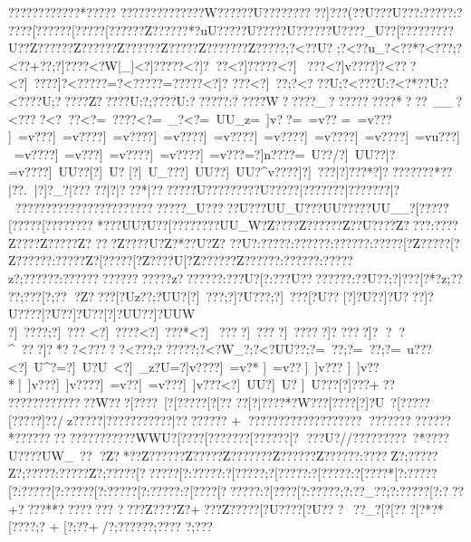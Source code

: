 {{{{{{{{{{{{{{{{{{{{{{{{{{{{{{{{{{{{{{{{{{{{{{{{{{{{{{{{{{{{{{{{{{{{{{{{{{{{{{{{{{{{{{{{{{{{{{{{{{{{{{{{{{{{{{{{{{{{{{{{{{{{{{{{{{{{{{{{{{{{{{{{{{{{{{{{{{{{{{{{{{{{{{{{{{{{{{{{{{{{{{{{{{{{{{{{{{{{{{{{{{{{{{{{{{{{{{{{{{{{{{{{{{{{{{{{{{{{{{{{{{{{{{{{{{{{{{{{{{{{{{{{{{{{{{{{{{{{{{{{{{{{{{{{{{{{{{{{{{{{{{{{{{{{{{{{{{{{{{{{{{{{{{{{{{{{{{{{{{{{{{{{{{{{{{{{{{{{{{{{{{{{{{{{{{{{{{{{{{{{{{{{{{{{{{{{{{{{{{{{{{{{{{{{{{{{{?????{? ?????{? *????{? 
????{? ?????{????W??{????U??{?  ????{???]??{?(??U{???U?  ??:?  ????:? 
????[? ?????[?  ????[? ?????Z?  ????{?*?uU??{? ??U??{? ??U??{????U??{? ?_U??[? ?????{? ??U??Z? ?????Z? ?????Z?????{?Z?  ????Z???????Z?????;?<??U?
;?<??u_?<?\??*? <?\??  ?;?<??+??;?]?? ??<?\?W|_]<?]?????<?]???<?]?????<?]~
???<?]v????]?<???<?]~????]?<?????=?<?????\?=?????<?]?
???<?]~  ??;?<?
??U;?<? ??U:?<?*??U:?<????U;?? ???Z?????U:?;????U:??????:?????W?????_?????????  ?*???~__?<????<???<?=~????<?=~_?<?=~UU_z=~]v? ?=~=v?? 
=~=v??? ]~=v???]~=v????]~=v????]~=v????]~=v????]~=v????]~=v????]~=v????]~=vu???]~=v????]~=v???]~=v????]~=v????]~=v???=?]n????\?=~U??/{?]~UU??|?=v??? {?]~UU??[?]~U?
 [?]~U_??{?]~UU??\?]~UU? \?^v????]?]~??? |?]???*?\?]?  ?\?}?????\?}? *??|?\??.|?]?_?  |?}??
??|?|???*|?}??? ??}?U?? ??}??  ??}?U?????|???????|???????|?????????????{???????{??????{???_U??{???U??{?UU_U??{?UU????{?UU__{?[? ???{?[? ???{?[? ???{?{???
*??{?UU?U??[???????{?UU_W{?Z? ???Z?{?????Z?{?U???{?Z? ??{?:?  ??{?Z?  ??{?Z? ???{?Z? ??{?Z????U{?Z?*??U{?Z? ??U{?:? ???{?:?????{?:?????{?:?????[?Z?????[?Z?????{?:?????Z?[?????[?Z????U[?Z?????{?Z?????{?:?????{?:?????z?;?????{?:?????{??????{??????z??????{?:???U?[?:???U?{??????{?:??U??;?|? ??[?\? *?z;?\?? ??;?\??  ?[?;??
?Z?\????[?\?Uz??;?\?UU? [?]~??? ;?]?U???;?]~??? [?\?U??
[?]?U?  {?]?U? ??]?U???{?]?U?  {?]?U?? [?]?UU??\?]?UUW\\?]~????;?]~???
<?]~????<?]~???*<?]~
????]~ ????]~?????]?
????]?
??^~  ???]? *??<?????<???;??????;?<?W_? ;?<?UU??;?=~??  ;?=~??  ;?=~u???<?]~U^?=?]~U?U~<?]~_z?U=?]v????]~=v?*
 ]~=v?? ]~]v???
]~]v??*]~]v?? ?]~]v????]~=v??  ]~=v??? ]~]v??? <?]~UU?\?]~U?
 \?]~U???[?]???+{?\??

??{??????{????{?{?W??{?[????~[?[?????[?[??
??[?|????*{?\?W???[?}???  [?]?U~? [?}???? [?}?}??{?]??/ z?}???{?|?????{?}?????|?}??????}?
+??????????????????{????????
??????*?????{?????{???????{??WWU{?[? ???[?{?????{?[?????{?[?
  ??{?U?//??{???? ??{?~?*???{?U???{?UW_~{?{?   {?Z? *?{?Z?????{?Z?????Z?{?????{?Z?????{?Z?????{?:????Z?;?????Z?;?????:?{???? Z?;?????[??????[?:?????:?[?????;?[?????:?[?????:?[????*[?:?????[?:?????[?:?????[?:?????[?:?????:?[???? [??????:?[???? [?:?????;?:??_??;?:?????[?:???+{????**{????  {????
 {???   {?Z???{?Z?+??{?Z?? ??{?[?U???{?[?U??
{?~?   {?\?_?[?[???[?\?*?* [?\? ???;?\? 
+
[?;??+/{?;?????{?;????
{?;???
}}}}}}}}}}}}}}}}}}}}}}}}}}}}}}}}}}}}}}}}}}}}}}}}}}}}}}}}}}}}}}}}}}}}}}}}}}}}}}}}}}}}}}}}}}}}}}}}}}}}}}}}}}}}}}}}}}}}}}}}}}}}}}}}}}}}}}}}}}}}}}}}}}}}}}}}}}}}}}}}}}}}}}}}}}}}}}}}}}}}}}}}}}}}}}}}}}}}}}}}}}}}}}}}}}}}}}}}}}}}}}}}}}}}}}}}}}}}}}}}}}}}}}}}}}}}}}}}}}}}}}}}}}}}}}}}}}}}}}}}}}}}}}}}}}}}}}}}}}}}}}}}}}}}}}}}}}}}}}}}}}}}}}}}}}}}}}}}}}}}}}}}}}}}}}}}}}}}}}}}}}}}}}}}}}}}}}}}}}}}}}}}}}}}}}}}}}}}}}}}}}}}}}}}}}}}}}}}}}}}}}}}}}}}}}}}}}}}}}}}}}}}}}}}}}}}}}}}}}}}}}}}}}}}}}}}}}}}}}}}}}}}}}}}}}}}}}}}}}}}}}}}}}}
